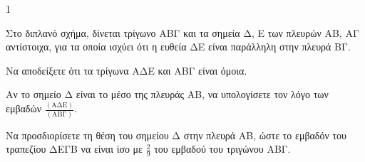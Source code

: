 \begin{ylh}{1}
    \item[Γεωμετρία - Όμοια Τρίγωνα]
\end{ylh}
\begin{figure}
    \centering
\end{figure}
Στο διπλανό σχήμα, δίνεται τρίγωνο ΑΒΓ και τα σημεία Δ, Ε των πλευρών ΑΒ, ΑΓ αντίστοιχα, για τα οποία ισχύει ότι η ευθεία ΔΕ είναι παράλληλη στην πλευρά ΒΓ.

\begin{alist}
    \item Να αποδείξετε ότι τα τρίγωνα ΑΔΕ και ΑΒΓ είναι όμοια.

    \item Αν το σημείο Δ είναι το μέσο της πλευράς ΑΒ, να υπολογίσετε τον λόγο των εμβαδών $\frac{(\text{ΑΔΕ})}{(\text{ΑΒΓ})}$.

    \item Να προσδιορίσετε τη θέση του σημείου Δ στην πλευρά ΑΒ, ώστε το εμβαδόν του τραπεζίου ΔΕΓΒ να είναι ίσο με $\frac{2}{9}$ του εμβαδού του τριγώνου ΑΒΓ.
\end{alist}